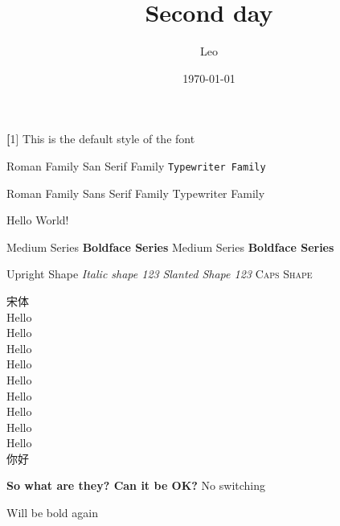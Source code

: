 \documentclass{article}
\title{Second day}
\author{Leo}
\date{\today}
\newcommand{\myfont}{\textsf{\textbf[1]}}
\begin{document}
\maketitle

\myfont{
    This is the default style of the font
}


\textrm{Roman Family} \textsf{San Serif Family} \texttt{Typewriter Family}


{\rmfamily Roman Family} {\sffamily Sans Serif Family} {\ttfamily Typewriter Family}

\sffamily Hello World!

\textmd{Medium Series} \textbf{Boldface Series}
{\mdseries Medium Series} {\bfseries Boldface Series}

\textup{Upright Shape} \textit{Italic shape 123}
{\slshape Slanted Shape 123} {\scshape Caps Shape}

{\songti 宋体}\\
{\tiny Hello} \\
{\scriptsize Hello} \\
{\footnotesize Hello} \\
{\small Hello} \\
{\normalsize Hello} \\
{\large Hello} \\
{\LARGE Hello} \\
{\huge Hello} \\
{\Huge Hello} \\
{你好}


{\bfseries
So what are they?
Can it be OK?
}
No switching

Will be bold again
\end{document}
